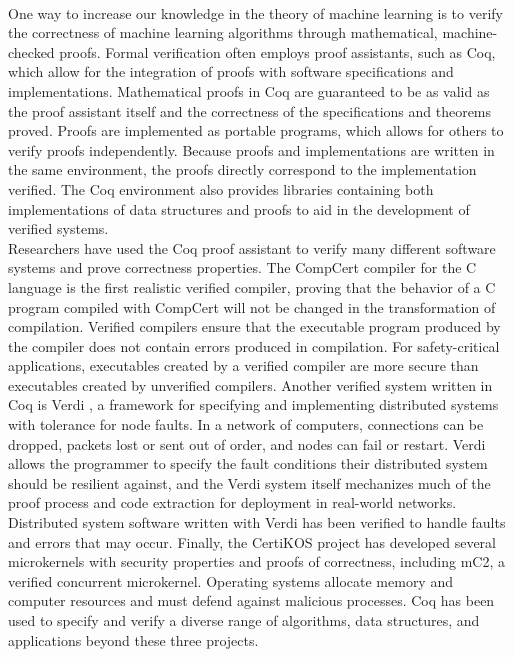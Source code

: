 \\One way to increase our knowledge in the theory of machine learning is to verify the correctness of machine learning algorithms through mathematical, machine-checked proofs. Formal verification often employs proof assistants, such as Coq, which allow for the integration of proofs with software specifications and implementations. Mathematical proofs in Coq are guaranteed to be as valid as the proof assistant itself and the correctness of the specifications and theorems proved. Proofs are implemented as portable programs, which allows for others to verify proofs independently. Because proofs and implementations are written in the same environment, the proofs directly correspond to the implementation verified. The Coq environment also provides libraries containing both implementations of data structures and proofs to aid in the development of verified systems.
\\Researchers have used the Coq proof assistant to verify many different software systems and prove correctness properties. The CompCert compiler for the C language \cite{Ler09} is the first realistic verified compiler, proving that the behavior of a C program compiled with CompCert will not be changed in the transformation of compilation. Verified compilers ensure that the executable program produced by the compiler does not contain errors produced in compilation. For safety-critical applications, executables created by a verified compiler are more secure than executables created by unverified compilers. Another verified system written in Coq is Verdi \cite{WWP15}, a framework for specifying and implementing distributed systems with tolerance for node faults. In a network of computers, connections can be dropped, packets lost or sent out of order, and nodes can fail or restart. Verdi allows the programmer to specify the fault conditions their distributed system should be resilient against, and the Verdi system itself mechanizes much of the proof process and code extraction for deployment in real-world networks. Distributed system software written with Verdi has been verified to handle faults and errors that may occur. Finally, the CertiKOS project \cite{GSC16} has developed several microkernels with security properties and proofs of correctness, including mC2, a verified concurrent microkernel. Operating systems allocate memory and computer resources and must defend against malicious processes. Coq has been used to specify and verify a diverse range of algorithms, data structures, and applications beyond these three projects.
